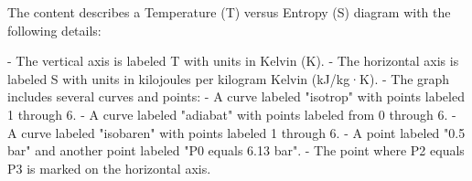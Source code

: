 The content describes a Temperature (T) versus Entropy (S) diagram with the following details:

- The vertical axis is labeled T with units in Kelvin (K).
- The horizontal axis is labeled S with units in kilojoules per kilogram Kelvin (kJ/kg·K).
- The graph includes several curves and points:
  - A curve labeled "isotrop" with points labeled 1 through 6.
  - A curve labeled "adiabat" with points labeled from 0 through 6.
  - A curve labeled "isobaren" with points labeled 1 through 6.
  - A point labeled "0.5 bar" and another point labeled "P0 equals 6.13 bar".
- The point where P2 equals P3 is marked on the horizontal axis.